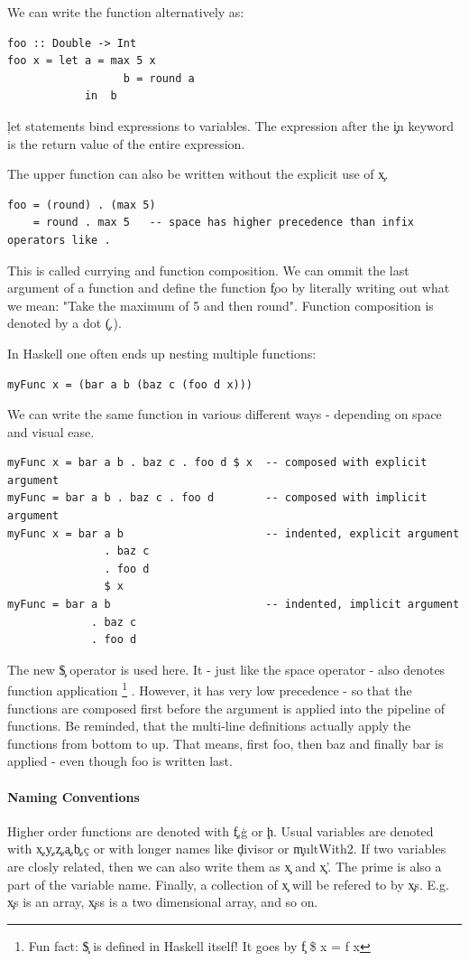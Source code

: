   
  We can write the function alternatively as:
  \begin{lstlisting}
foo :: Double -> Int
foo x = let a = max 5 x
                  b = round a
            in  b
  \end{lstlisting}
  \c{let} statements bind expressions to variables.
  The expression after the \c{in} keyword is the return value of the
  entire expression.
  
  
  The upper function can also be written without the explicit use of \c{x}.
  \begin{lstlisting}
foo = (round) . (max 5)
    = round . max 5   -- space has higher precedence than infix operators like .
  \end{lstlisting}
  This is called currying and function composition.
  We can ommit the last argument of a function and define the function
  \c{foo} by literally writing out what we mean:
  "Take the maximum of 5 and then round".
  Function composition is denoted by a dot \c{(.)}.
  
  In Haskell one often ends up nesting multiple functions:
  \begin{lstlisting}
myFunc x = (bar a b (baz c (foo d x)))
  \end{lstlisting}
  We can write the same function in various different ways - depending on space
  and visual ease.
  \begin{lstlisting}
myFunc x = bar a b . baz c . foo d $ x  -- composed with explicit argument
myFunc = bar a b . baz c . foo d        -- composed with implicit argument
myFunc x = bar a b                      -- indented, explicit argument
               . baz c 
               . foo d
               $ x
myFunc = bar a b                        -- indented, implicit argument
             . baz c
             . foo d
  \end{lstlisting}
    The new \c{\$} operator is used here. It - just like the space operator
    - also denotes function application
    \footnote{Fun fact: \c{\$} is defined in Haskell itself! It goes by \c{f \$ x = f x}}
    . However, it
    has very low precedence - so that the functions are composed first
    before the argument is applied into the pipeline of functions.
    Be reminded, that the multi-line definitions actually apply
    the functions from bottom to up. That means, first foo, then baz
    and finally bar is applied - even though foo is written last.
    
  \paragraph{Naming Conventions}
    Higher order functions are denoted with \c{f},\c{g} or \c{h}.
    Usual variables are denoted with \c{x},\c{y},\c{z},\c{a},\c{b},\c{c}
    or with longer names like \c{divisor} or \c{multWith2}.
    If two variables are closly related, then we
    can also write them as \c{x} and \c{x'}. The prime is also
    a part of the variable name.
    Finally, a collection of \c{x} will be refered to by \c{xs}.
    E.g. \c{xs} is an array, \c{xss} is a two dimensional array, and so on.
  
